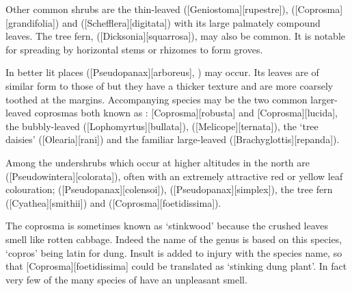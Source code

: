 Other common shrubs are the thin-leaved  ([Geniostoma][rupestre]),  ([Coprosma][grandifolia]) and  ([Schefflera][digitata]) with its large palmately compound leaves.
The tree fern,  ([Dicksonia][squarrosa]), may also be common.
It is notable for spreading by horizontal stems or rhizomes to form groves.

In better lit places  ([Pseudopanax][arboreus], ) may occur.
Its leaves are of similar form to those of  but they have a thicker texture and are more coarsely toothed at the margins.
Accompanying species may be the two common larger-leaved coprosmas both known as : [Coprosma][robusta] and [Coprosma][lucida], the bubbly-leaved  ([Lophomyrtus][bullata]),  ([Melicope][ternata]), the `tree daisies'  ([Olearia][rani]) and the familiar large-leaved  ([Brachyglottis][repanda]).

Among the undershrubs which occur at higher altitudes in the north are  ([Pseudowintera][colorata]), often with an extremely attractive red or yellow leaf colouration;  ([Pseudopanax][colensoi]),  ([Pseudopanax][simplex]), the tree fern  ([Cyathea][smithii]) and  ([Coprosma][foetidissima]).

The coprosma is sometimes known as `stinkwood' because the crushed leaves smell like rotten cabbage.
Indeed the name of the genus is based on this species, `copros' being latin for dung.
Insult is added to injury with the species name, so that [Coprosma][foetidissima] could be translated as `stinking dung plant'.
In fact very few of the many species of  have an unpleasant smell.

